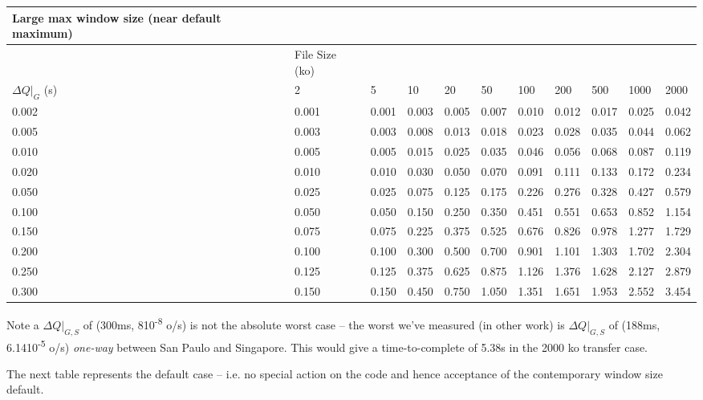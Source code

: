 \documentclass[11pt,a4paper]{article}
\begin{document}
\begin{longtable}[]{@{}lllllllllll@{}}
\toprule
Large max window size (near default maximum) & & & & & & & & &
&\tabularnewline
\midrule
\endhead
& File Size (ko) & & & & & & & & &\tabularnewline
$\Delta{}Q|_G$ (s) & 2 & 5 & 10 & 20 & 50 & 100 & 200 &
500 & 1000 & 2000\tabularnewline
0.002 & 0.001 & 0.001 & 0.003 & 0.005 & 0.007 & 0.010 & 0.012 & 0.017 &
0.025 & 0.042\tabularnewline
0.005 & 0.003 & 0.003 & 0.008 & 0.013 & 0.018 & 0.023 & 0.028 & 0.035 &
0.044 & 0.062\tabularnewline
0.010 & 0.005 & 0.005 & 0.015 & 0.025 & 0.035 & 0.046 & 0.056 & 0.068 &
0.087 & 0.119\tabularnewline
0.020 & 0.010 & 0.010 & 0.030 & 0.050 & 0.070 & 0.091 & 0.111 & 0.133 &
0.172 & 0.234\tabularnewline
0.050 & 0.025 & 0.025 & 0.075 & 0.125 & 0.175 & 0.226 & 0.276 & 0.328 &
0.427 & 0.579\tabularnewline
0.100 & 0.050 & 0.050 & 0.150 & 0.250 & 0.350 & 0.451 & 0.551 & 0.653 &
0.852 & 1.154\tabularnewline
0.150 & 0.075 & 0.075 & 0.225 & 0.375 & 0.525 & 0.676 & 0.826 & 0.978 &
1.277 & 1.729\tabularnewline
0.200 & 0.100 & 0.100 & 0.300 & 0.500 & 0.700 & 0.901 & 1.101 & 1.303 &
1.702 & 2.304\tabularnewline
0.250 & 0.125 & 0.125 & 0.375 & 0.625 & 0.875 & 1.126 & 1.376 & 1.628 &
2.127 & 2.879\tabularnewline
0.300 & 0.150 & 0.150 & 0.450 & 0.750 & 1.050 & 1.351 & 1.651 & 1.953 &
2.552 & 3.454\tabularnewline
\bottomrule
\end{longtable}

Note a $\Delta{}Q|_{G,S}$ of (300ms, 8\texttimes{}10\textsuperscript{-8} o/s) is not the
absolute worst case -- the worst we've measured (in other work) is
$\Delta{}Q|_{G,S}$ of (188ms, 6.14\texttimes{}10\textsuperscript{-5} o/s) \emph{one-way}
between San Paulo and Singapore. This would give a time-to-complete of
5.38s in the 2000 ko transfer case.

The next table represents the default case -- i.e. no special action on
the code and hence acceptance of the contemporary window size default.
\end{document}
